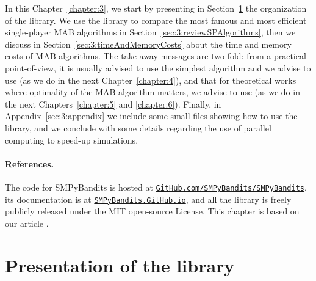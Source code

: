 In this Chapter~\ref{chapter:3}, we start by presenting in Section~\ref{sec:3:presentationLibrary} the organization of the library.
We use the library to compare the most famous and most efficient single-player MAB algorithms in Section~\ref{sec:3:reviewSPAlgorithms},
then we discuss in Section~\ref{sec:3:timeAndMemoryCosts} about the time and memory costs of MAB algorithms.
The take away messages are two-fold:
from a practical point-of-view, it is usually advised to use the simplest algorithm and we advise to use \UCB{} (as we do in the next Chapter~\ref{chapter:4}),
and that for theoretical works where optimality of the MAB algorithm matters, we advise to use \klUCB{} (as we do in the next Chapters~\ref{chapter:5} and \ref{chapter:6}).
%
Finally, in Appendix~\ref{sec:3:appendix} we include some small files showing how to use the library, and we conclude with some details regarding the use of parallel computing to speed-up simulations.


\paragraph{References.}
%
The code for SMPyBandits is hosted at \texttt{\href{https://GitHub.com/SMPyBandits/SMPyBandits/}{GitHub.com/SMPyBandits/SMPyBandits}}, its documentation is at \texttt{\href{https://SMPyBandits.GitHub.io/}{SMPyBandits.GitHub.io}}, and all the library is freely publicly released under the MIT open-source License.
This chapter is based on our article \cite{SMPyBanditsJMLR}.


\section{Presentation of the library}
\label{sec:3:presentationLibrary}


